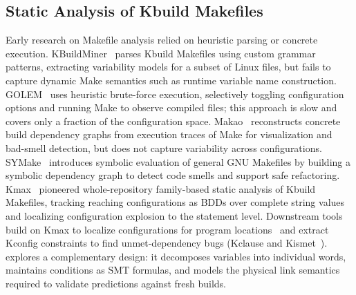 \documentclass[acmsmall,screen,review,anonymous,nonacm]{acmart}
\begin{document}
  \subsection{Static Analysis of Kbuild Makefiles}
    \label{sec:related:kbuild}
    Early research on Makefile analysis relied on heuristic parsing or concrete execution.
    KBuildMiner~\cite{berger2010feature} parses Kbuild Makefiles using custom grammar patterns, extracting variability models for a subset of Linux files, but fails to capture dynamic Make semantics such as runtime variable name construction.
    GOLEM~\cite{dietrich2012variability} uses heuristic brute-force execution, selectively toggling configuration options and running Make to observe compiled files; this approach is slow and covers only a fraction of the configuration space.
    Makao~\cite{adams2007makao} reconstructs concrete build dependency graphs from execution traces of Make for visualization and bad-smell detection, but does not capture variability across configurations.
    SYMake~\cite{tamrawi2012symmake} introduces symbolic evaluation of general GNU Makefiles by building a symbolic dependency graph to detect code smells and support safe refactoring.
    Kmax~\cite{gazzillo2017kmax} pioneered whole-repository family-based static analysis of Kbuild Makefiles, tracking reaching configurations as BDDs over complete string values and localizing configuration explosion to the statement level.
    Downstream tools build on Kmax to localize configurations for program locations~\cite{gazzillo2018localizing} and extract Kconfig constraints to find unmet-dependency bugs (Kclause and Kismet~\cite{oh2021kclause}).
    \tool{} explores a complementary design: it decomposes variables into individual words, maintains conditions as SMT formulas, and models the physical link semantics required to validate predictions against fresh builds.
\end{document}
